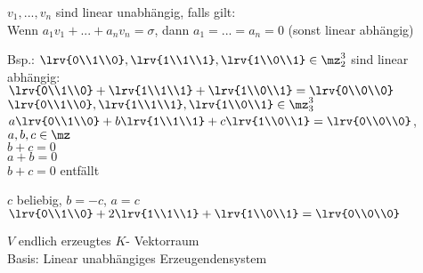 		\item $v_1,...,v_n$ sind linear unabhängig, falls gilt:\\
		Wenn $a_1v_1+...+a_nv_n=\sigma$, dann $a_1=...=a_n=0$ (sonst linear abhängig)

		Bsp.: $\lrv{0\\1\\0},\lrv{1\\1\\1},\lrv{1\\0\\1}\in\mz_2^3$ sind linear abhängig:\\
		$\lrv{0\\1\\0}+\lrv{1\\1\\1}+\lrv{1\\0\\1}=\lrv{0\\0\\0}$\\
		$\lrv{0\\1\\0},\lrv{1\\1\\1},\lrv{1\\0\\1}\in\mz_3^3$\\
		$a\lrv{0\\1\\0}+b\lrv{1\\1\\1}+c\lrv{1\\0\\1}=\lrv{0\\0\\0}$, $a,b,c\in\mz$\\
		$b+c=0$\\
		$a+b=0$\\
		$b+c=0$ entfällt

		$c$ beliebig, $b=-c$, $a=c$\\
		$\lrv{0\\1\\0}+2\lrv{1\\1\\1}+\lrv{1\\0\\1}=\lrv{0\\0\\0}$

		\item $V$ endlich erzeugtes $K$- Vektorraum\\
		Basis: Linear unabhängiges Erzeugendensystem
	\subExEnd

